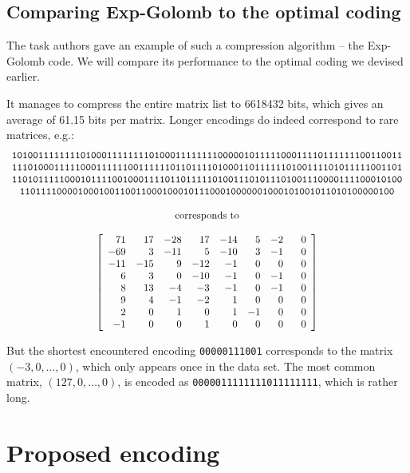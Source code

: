 \documentclass[11pt]{llncs}
\begin{document}
\subsection{Comparing Exp-Golomb to the optimal coding}
The task authors gave an example of such a compression algorithm -- the Exp-Golomb code. We will compare its performance to the optimal coding we devised earlier.

It manages to compress the entire matrix list to 6618432 bits, which gives an average of 61.15 bits per matrix. Longer encodings do indeed correspond to rare matrices, e.g.:
\small \[ \begin{array}{c}
\texttt{10100111111110100011111111010001111111100000101111100011110111111100110011}\\
\texttt{11101000111110001111110011111101101111010001101111110100111101011111001101}\\
\texttt{11010111110001011110010001111011011111010011101011101001110000111100010100}\\
\texttt{11011110000100010011001100010001011100010000001000101001011010100000100}\\\\
\text{corresponds to} \\\\
\left[ \begin{array}{rrrrrrrr}
 71 &  17 & -28 &  17 & -14 &  5 & -2 & \hphantom{-}0 \\
-69 &   3 & -11 &   5 & -10 &  3 & -1 & 0 \\
-11 & -15 &   9 & -12 &  -1 &  0 &  0 & 0 \\
  6 &   3 &   0 & -10 &  -1 &  0 & -1 & 0 \\
  8 &  13 &  -4 &  -3 &  -1 &  0 & -1 & 0 \\
  9 &   4 &  -1 &  -2 &   1 &  0 &  0 & 0 \\
  2 &   0 &   1 &   0 &   1 & -1 &  0 & 0 \\
 -1 &   0 &   0 &   1 &   0 &  0 &  0 & 0 \\
\end{array} \right]
\end{array} \] \normalsize

But the shortest encountered encoding \texttt{00000111001} corresponds to the matrix $(-3, 0, \dots, 0)$, which only appears once in the data set. The most common matrix, $(127, 0, \dots, 0)$, is encoded as \texttt{0000011111111011111111}, which is rather long.

\section{Proposed encoding}
\end{document}
